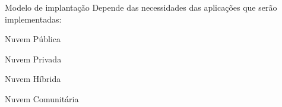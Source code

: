 \begin{frame}{Modelo de implantação}
    Depende das necessidades das aplicações que serão implementadas:
    \begin{itemise}
        \item<2-> Nuvem Pública
        \item<3-> Nuvem Privada
        \item<4-> Nuvem Híbrida
        \item<5-> Nuvem Comunitária
    \end{itemise}
\end{frame}
